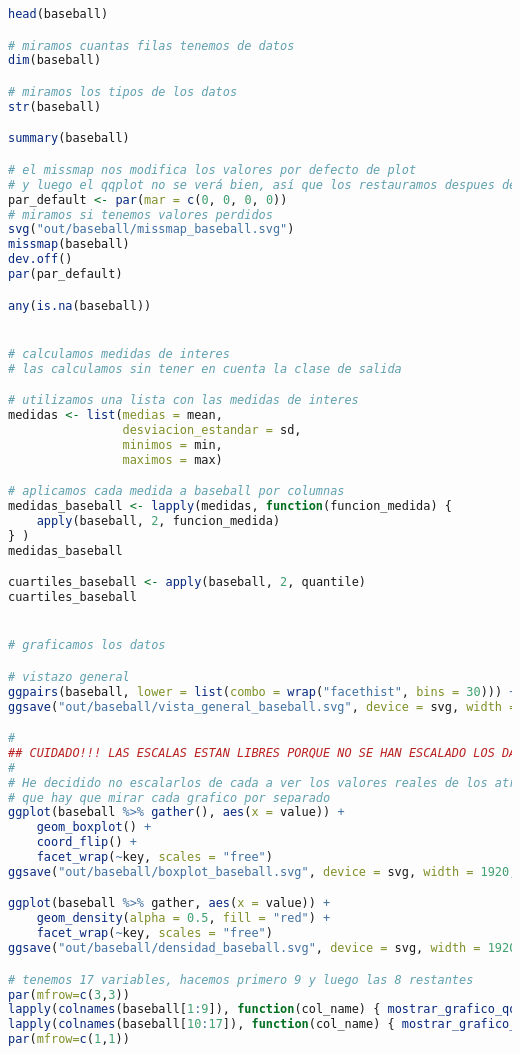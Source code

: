 \begin{lstlisting}[language=R]
head(baseball)

# miramos cuantas filas tenemos de datos
dim(baseball)

# miramos los tipos de los datos
str(baseball)

summary(baseball)

# el missmap nos modifica los valores por defecto de plot
# y luego el qqplot no se verá bien, así que los restauramos despues del missmap
par_default <- par(mar = c(0, 0, 0, 0))
# miramos si tenemos valores perdidos
svg("out/baseball/missmap_baseball.svg")
missmap(baseball)
dev.off()
par(par_default)

any(is.na(baseball))


# calculamos medidas de interes
# las calculamos sin tener en cuenta la clase de salida

# utilizamos una lista con las medidas de interes
medidas <- list(medias = mean,
				desviacion_estandar = sd,
				minimos = min,
				maximos = max)

# aplicamos cada medida a baseball por columnas
medidas_baseball <- lapply(medidas, function(funcion_medida) {
	apply(baseball, 2, funcion_medida)
} )
medidas_baseball

cuartiles_baseball <- apply(baseball, 2, quantile)
cuartiles_baseball


# graficamos los datos

# vistazo general
ggpairs(baseball, lower = list(combo = wrap("facethist", bins = 30))) + theme_minimal()
ggsave("out/baseball/vista_general_baseball.svg", device = svg, width = 1920, height = 1080, units = "px", dpi = 100)

#
## CUIDADO!!! LAS ESCALAS ESTAN LIBRES PORQUE NO SE HAN ESCALADO LOS DATOS
#
# He decidido no escalarlos de cada a ver los valores reales de los atributos, así
# que hay que mirar cada grafico por separado
ggplot(baseball %>% gather(), aes(x = value)) +
	geom_boxplot() +
	coord_flip() +
	facet_wrap(~key, scales = "free")
ggsave("out/baseball/boxplot_baseball.svg", device = svg, width = 1920, height = 1080, units = "px", dpi = 150)

ggplot(baseball %>% gather, aes(x = value)) +
	geom_density(alpha = 0.5, fill = "red") +
	facet_wrap(~key, scales = "free")
ggsave("out/baseball/densidad_baseball.svg", device = svg, width = 1920, height = 1080, units = "px", dpi = 150)

# tenemos 17 variables, hacemos primero 9 y luego las 8 restantes
par(mfrow=c(3,3))
lapply(colnames(baseball[1:9]), function(col_name) { mostrar_grafico_qq(baseball[,col_name], col_name, save_plot = TRUE, directorio = "baseball") } )
lapply(colnames(baseball[10:17]), function(col_name) { mostrar_grafico_qq(baseball[,col_name], col_name, save_plot = TRUE, directorio = "baseball") } )
par(mfrow=c(1,1))



\end{lstlisting}
